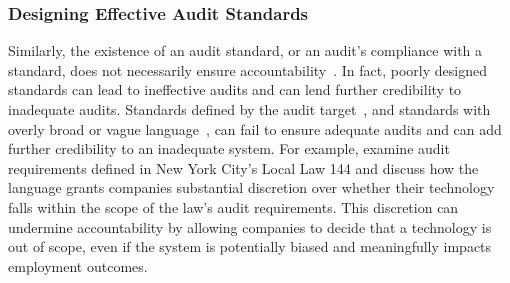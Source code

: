 \subsubsection{Designing Effective Audit Standards}
 Similarly, the existence of an audit standard, or an audit's compliance with a standard, does not necessarily ensure accountability~\cite{ojewale2025towards}. In fact, poorly designed standards can lead to ineffective audits and can lend further credibility to inadequate audits. Standards defined by the audit target~\cite{goodman2022algorithmic, hoofnagle2016assessing}, and standards with overly broad or vague language~\cite{goodman2022algorithmic, costanza2022audits, raji2022outsider, wright2024null, morrison2020vacuous}, can fail to ensure adequate audits and can add further credibility to an inadequate system. For example, \citet{wright2024null} examine audit requirements defined in New York City's Local Law 144 and discuss how the language grants companies substantial discretion over whether their technology falls within the scope of the law's audit requirements. This discretion can undermine accountability by allowing companies to decide that a technology is out of scope, even if the system is potentially biased and meaningfully impacts employment outcomes.
 

